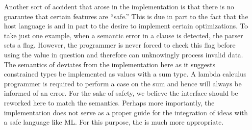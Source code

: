 
Another sort of accident that arose in the
\pads{} implementation is that there is no guarantee that
certain features are ``safe.''  This is due in part to the fact that
the \pads{} host language is \C{} and in part to the desire to implement
certain optimizations.  To take just one example, when a 
semantic error in a \Pwhere{} clause is detected, the parser sets a flag.  
However, the \C{} programmer is never forced to check this flag before using 
the value in question and therefore can unknowingly process invalid data.  The 
semantics of \ddc{} deviates from the \C{} implementation here as it suggests
constrained types be implemented as values with a sum type.  A lambda
calculus programmer is required to perform a case on the sum and
hence will always be informed of an error.
For the sake of safety, we believe the \C{} interface should be reworked 
here to match the semantics.  
Perhaps more importantly, the \C{} implementation does not serve as a
proper guide for the integration of \pads{} ideas with a safe language like ML.
For this purpose, the \ddc{} is much more appropriate.






